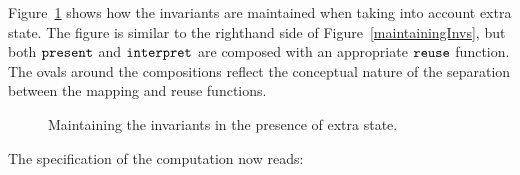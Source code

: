 Figure~\ref{maintainExtraState} shows how the invariants are maintained when taking into account extra state. The figure is similar to the righthand side of Figure~\ref{maintainingInvs}, but both ${\tt present}$ and
 ${\tt interpret}$ are composed with an appropriate ${\tt reuse}$ function. The ovals around the compositions reflect the conceptual nature of the separation between the mapping and reuse functions. 

\begin{figure}
\begin{center}
\begin{center}
\end{center}
\caption{Maintaining the invariants in the presence of extra state.}\label{maintainExtraState} 
\end{center}
\end{figure}



The specification of the computation now reads: 

